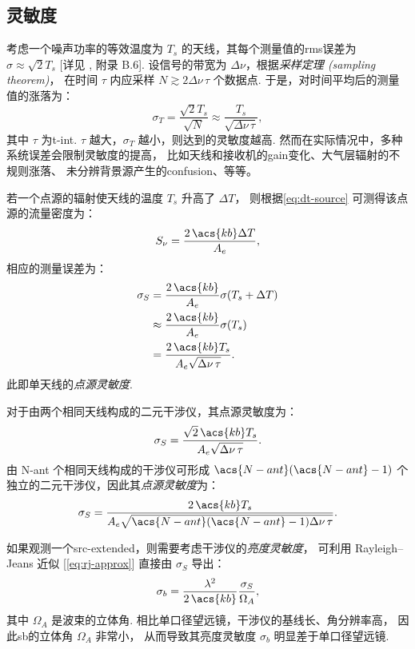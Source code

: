 \subsection{灵敏度}

考虑一个噪声功率的等效温度为 $T_s$ 的天线，其每个测量值的\ac{rms}误差为
$\sigma \approx \sqrt{2} T_s$
[详见 , 附录 B.6].
设信号的带宽为 $\Delta\nu$，根据\emph{采样定理 (sampling theorem)}，
在时间 $\tau$ 内应采样 $N \gtrsim 2 \Delta\nu \,\tau$ 个数据点.
于是，对时间平均后的测量值的涨落为：
\begin{equation}
  \label{eq:radiometer}
  \sigma_T = \frac{\sqrt{2} T_s}{\sqrt{N}}
    \approx \frac{T_s}{\sqrt{\Delta\nu \,\tau}} ,
\end{equation}
其中 $\tau$ 为\ac{t-int}.
$\tau$ 越大，$\sigma_T$ 越小，则达到的灵敏度越高.
然而在实际情况中，多种系统误差会限制灵敏度的提高，
比如天线和接收机的\ac{gain}变化、大气层辐射的不规则涨落、
未分辨背景源产生的\ac{confusion}、等等。

若一个点源的辐射使天线的温度 $T_s$ 升高了 $\Delta T$，
则根据\autoref{eq:dt-source} 可测得该点源的流量密度为：
\begin{equation}
  S_{\nu} = \frac{2\,\acs{kb} \Delta T}{A_e} ,
\end{equation}
相应的测量误差为：
\begin{align}
  \sigma_S
    & = \frac{2\,\acs{kb}}{A_e} \sigma(T_s + \Delta T) \\
    & \approx \frac{2\,\acs{kb}}{A_e} \sigma(T_s) \\
    & = \frac{2\,\acs{kb} T_s}{A_e \sqrt{\Delta\nu \,\tau}} .
\end{align}
此即单天线的\emph{点源灵敏度}.

对于由两个相同天线构成的二元干涉仪，其点源灵敏度为：
\begin{equation}
  \label{eq:sigma-ps1}
  \sigma_S = \frac{\sqrt{2}\,\acs{kb} T_s}{A_e \sqrt{\Delta\nu \,\tau}} .
\end{equation}
由 \acs{N-ant} 个相同天线构成的干涉仪可形成 $\acs{N-ant}(\acs{N-ant}-1)$
个独立的二元干涉仪，因此其\emph{点源灵敏度}为：
\begin{equation}
  \label{eq:sigma-ps}
  \sigma_S = \frac{2\,\acs{kb} T_s}{
    A_e \sqrt{\acs{N-ant}(\acs{N-ant}-1) \Delta\nu \,\tau}} .
\end{equation}

如果观测一个\acf{src-extended}，则需要考虑干涉仪的\emph{亮度灵敏度}，
可利用 Rayleigh--Jeans 近似 [\autoref{eq:rj-approx}]
直接由 $\sigma_S$ 导出：
\begin{equation}
  \label{eq:sigma-tb}
  \sigma_b = \frac{\lambda^2}{2\,\acs{kb}} \frac{\sigma_S}{\Omega_A} ,
\end{equation}
其中 $\Omega_A$ 是波束的立体角.
相比单口径望远镜，干涉仪的基线长、角分辨率高，
因此\ac{sb}的立体角 $\Omega_A$ 非常小，
从而导致其亮度灵敏度 $\sigma_b$ 明显差于单口径望远镜.


